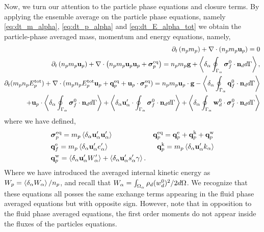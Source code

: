 Now, we turn our attention to the particle phase equations and closure terms. 
By applying the ensemble average on the particle phase equations, namely \ref{eq:dt_m_alpha}, \ref{eq:dt_p_alpha} and \ref{eq:dt_E_alpha_tot} we obtain the particle-phase averaged mass, momentum and energy equations, namely, 
\begin{align}
    \label{eq:dt_hybrid_mp}
    \partial_t \left(n_p m_p\right)
    + \mathbf{\nabla}\cdot \left(n_pm_p\textbf{u}_p
    \right)
    = 
    0\\
    \label{eq:dt_hybrid_up}
    \partial_t \left(n_p m_p \textbf{u}_p\right)
    + \mathbf{\nabla}\cdot \left(n_p
    m_p \textbf{u}_p \textbf{u}_p 
    + \bm{\sigma}_p^\text{eq}
    \right)
    = 
    n_p m_p \textbf{g}
    + \left<\delta_\alpha \oint_{\Gamma_{\alpha}} {\bm{\sigma}_f^0 \cdot \textbf{n}_d} d\Gamma\right>,\\
    \label{eq:dt_hybrid_Ep}
    \partial_t(m_p n_pE_p^\text{tot})
    + \mathbf{\nabla}\cdot(m_pn_p E_p^\text{tot} \textbf{u}_p 
    + \textbf{q}_p^\text{eq} 
    + \textbf{u}_p \cdot \bm{\sigma}_p^\text{eq})
    =  n_p m_p \textbf{u}_p\cdot  \textbf{g}
    -  \left<\delta_\alpha \oint_{\Gamma_{\alpha}} \textbf{q}_f^0 \cdot \textbf{n}_d d\Gamma\right>\nonumber\\
    + \textbf{u}_p \cdot\left<\delta_\alpha \oint_{\Gamma_{\alpha}} {\bm{\sigma}_f^0 \cdot \textbf{n}_d} d\Gamma\right>
    + \left<\delta_\alpha \textbf{u}_\alpha' \cdot\oint_{\Gamma_{\alpha}} \bm{\sigma}_f^0 \cdot \textbf{n}_d d\Gamma\right>
    + \left<\delta_\alpha \oint_{\Gamma_{\alpha}} {\textbf{w}_d^0 \cdot\bm{\sigma}_f^0 \cdot \textbf{n}_d} d\Gamma\right>
\end{align}
where we have defined, 
\begin{align*}
    &\bm{\sigma}_p^\text{eq}
    =  m_p\left<\delta_\alpha \textbf{u}_\alpha'\textbf{u}_\alpha'\right>
    &\textbf{q}_p^\text{eq}
    =\textbf{q}_p^\text{e} 
    +\textbf{q}_p^\text{k}  
    +\textbf{q}_p^\text{w}  
    \\
    &\textbf{q}_f^\text{e}
    = m_p \left<\delta_\alpha \textbf{u}_\alpha' e_\alpha'\right> 
    &\textbf{q}_p^\text{k}
    = m_p \left<\delta_\alpha \textbf{u}_\alpha' k_\alpha\right> 
    \\
    &\textbf{q}_p^\text{w}
    = 
     \left<\delta_\alpha \textbf{u}_\alpha'W_\alpha'\right>
    + \left<\delta_\alpha \textbf{u}_\alpha' s_\alpha' \gamma\right>.
\end{align*}
Where we have introduced the averaged internal kinetic energy as $W_p = \left<\delta_\alpha W_\alpha\right>/n_p$, and recall that $W_\alpha = \int_{\Omega_{\alpha}} \rho_d  (w_d^0)^2/2 d\Omega$. 
We recognize that these equations all posses the same exchange terms appearing in the fluid phase averaged equations but with opposite sign. 
However, note that in opposition to the fluid phase averaged equations, the first order moments do not appear inside the fluxes of the particles equations. 
